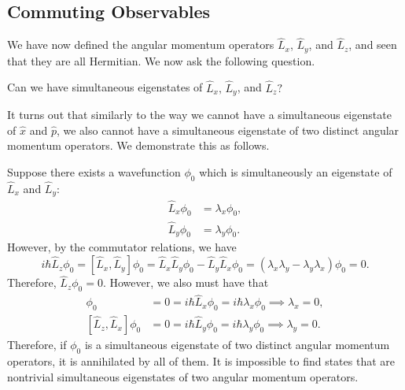 \subsection{Commuting Observables}\label{commuting_observables}

We have now defined the angular momentum operators $\hat{L}_x$, $\hat{L}_y$, and $\hat{L}_z$, and seen that they are all Hermitian. We now ask the following question.

\begin{framedquest*}
    Can we have simultaneous eigenstates of $\hat{L}_x,\,\hat{L}_y$, and $\hat{L}_z?$
\end{framedquest*}

It turns out that similarly to the way we cannot have a simultaneous eigenstate of $\hat{x}$ and $\hat{p}$, we also cannot have a simultaneous eigenstate of two distinct angular momentum operators. We demonstrate this as follows.

Suppose there exists a wavefunction $\phi_0$ which is simultaneously an eigenstate of $\hat{L}_x$ and $\hat{L}_y$: \begin{align*}\hat{L}_x\phi_0&=\lambda_x\phi_0,\\ \hat{L}_y\phi_0&=\lambda_y\phi_0.\end{align*}However, by the commutator relations, we have $$i\hbar\hat{L}_z\phi_0=[\hat{L}_x,\hat{L}_y]\phi_0=\hat{L}_x\hat{L}_y\phi_0-\hat{L}_y\hat{L}_x\phi_0=(\lambda_x\lambda_y-\lambda_y\lambda_x)\phi_0=0.$$Therefore, $\hat{L}_z\phi_0=0$. However, we also must have that \begin{align*}[\hat{L}_y,\hat{L}_z]\phi_0&=0=i\hbar\hat{L}_x\phi_0=i\hbar\lambda_x\phi_0\implies\lambda_x=0,\\ [\hat{L}_z,\hat{L}_x]\phi_0&=0=i\hbar\hat{L}_y\phi_0=i\hbar\lambda_y\phi_0\implies\lambda_y=0.\end{align*}Therefore, if $\phi_0$ is a simultaneous eigenstate of two distinct angular momentum operators, it is annihilated by all of them. It is impossible to find states that are nontrivial simultaneous eigenstates of two angular momentum operators.

